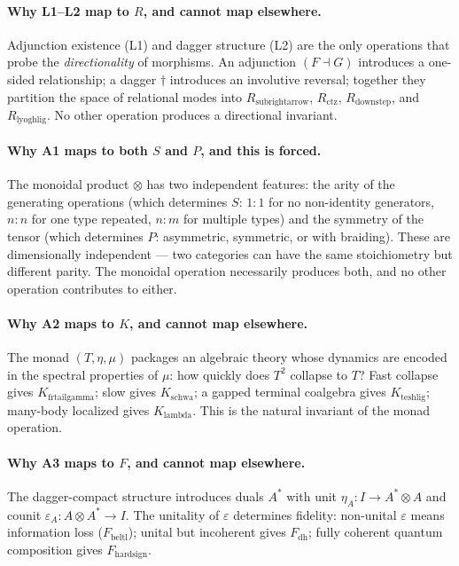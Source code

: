 \documentclass[12pt,a4paper]{article}
\begin{document}
\paragraph{Why L1--L2 map to $R$, and cannot map elsewhere.}
Adjunction existence (L1) and dagger structure (L2) are the only operations that probe the \emph{directionality} of morphisms. An adjunction $(F \dashv G)$ introduces a one-sided relationship; a dagger $\dagger$ introduces an involutive reversal; together they partition the space of relational modes into $R_{\text{subrightarrow}}$, $R_{\text{ctz}}$, $R_{\text{downstep}}$, and $R_{\text{lyoghlig}}$. No other operation produces a directional invariant.

\paragraph{Why A1 maps to both $S$ and $P$, and this is forced.}
The monoidal product $\otimes$ has two independent features: the arity of the generating operations (which determines $S$: $1{:}1$ for no non-identity generators, $n{:}n$ for one type repeated, $n{:}m$ for multiple types) and the symmetry of the tensor (which determines $P$: asymmetric, symmetric, or with braiding). These are dimensionally independent --- two categories can have the same stoichiometry but different parity. The monoidal operation necessarily produces both, and no other operation contributes to either.

\paragraph{Why A2 maps to $K$, and cannot map elsewhere.}
The monad $(T, \eta, \mu)$ packages an algebraic theory whose dynamics are encoded in the spectral properties of $\mu$: how quickly does $T^2$ collapse to $T$? Fast collapse gives $K_{\text{frtailgamma}}$; slow gives $K_{\text{schwa}}$; a gapped terminal coalgebra gives $K_{\text{teshlig}}$; many-body localized gives $K_{\text{lambda}}$. This is the natural invariant of the monad operation.

\paragraph{Why A3 maps to $F$, and cannot map elsewhere.}
The dagger-compact structure introduces duals $A^*$ with unit $\eta_A: I \to A^* \otimes A$ and counit $\varepsilon_A: A \otimes A^* \to I$. The unitality of $\varepsilon$ determines fidelity: non-unital $\varepsilon$ means information loss ($F_{\text{beltl}}$); unital but incoherent gives $F_{\text{dh}}$; fully coherent quantum composition gives $F_{\text{hardsign}}$.
\end{document}
